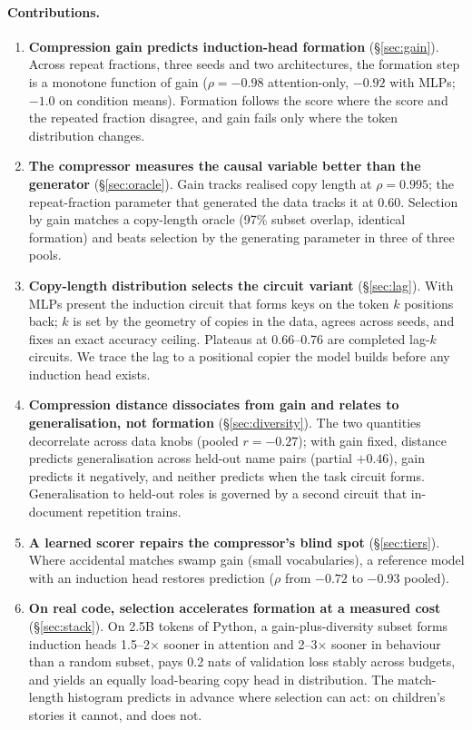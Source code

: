 \documentclass[11pt]{article}
\begin{document}
\paragraph{Contributions.}
\begin{enumerate}
\item \textbf{Compression gain predicts induction-head formation}
  (\S\ref{sec:gain}). Across repeat fractions, three seeds and two
  architectures, the formation step is a monotone function of gain
  ($\rho=-0.98$ attention-only, $-0.92$ with MLPs; $-1.0$ on condition
  means). Formation follows the score where the score and the repeated
  fraction disagree, and gain fails only where the token distribution
  changes.
\item \textbf{The compressor measures the causal variable better than the
  generator} (\S\ref{sec:oracle}). Gain tracks realised copy length at
  $\rho=0.995$; the repeat-fraction parameter that generated the data
  tracks it at $0.60$. Selection by gain matches a copy-length oracle
  (97\% subset overlap, identical formation) and beats selection by the
  generating parameter in three of three pools.
\item \textbf{Copy-length distribution selects the circuit variant}
  (\S\ref{sec:lag}). With MLPs present the induction circuit that forms
  keys on the token $k$ positions back; $k$ is set by the geometry of
  copies in the data, agrees across seeds, and fixes an exact accuracy
  ceiling. Plateaus at 0.66--0.76 are completed lag-$k$ circuits. We trace
  the lag to a positional copier the model builds before any induction head
  exists.
\item \textbf{Compression distance dissociates from gain and relates to
  generalisation, not formation} (\S\ref{sec:diversity}). The two
  quantities decorrelate across data knobs (pooled $r=-0.27$); with gain
  fixed, distance predicts generalisation across held-out name pairs
  (partial $+0.46$), gain predicts it negatively, and neither predicts when
  the task circuit forms. Generalisation to held-out roles is governed by a
  second circuit that in-document repetition trains.
\item \textbf{A learned scorer repairs the compressor's blind spot}
  (\S\ref{sec:tiers}). Where accidental matches swamp gain (small
  vocabularies), a reference model with an induction head restores
  prediction ($\rho$ from $-0.72$ to $-0.93$ pooled).
\item \textbf{On real code, selection accelerates formation at a measured
  cost} (\S\ref{sec:stack}). On 2.5B tokens of Python, a gain-plus-diversity
  subset forms induction heads 1.5--2$\times$ sooner in attention and
  2--3$\times$ sooner in behaviour than a random subset, pays 0.2 nats of
  validation loss stably across budgets, and yields an equally load-bearing
  copy head in distribution. The match-length histogram predicts in advance
  where selection can act: on children's stories it cannot, and does not.
\end{enumerate}
\end{document}
